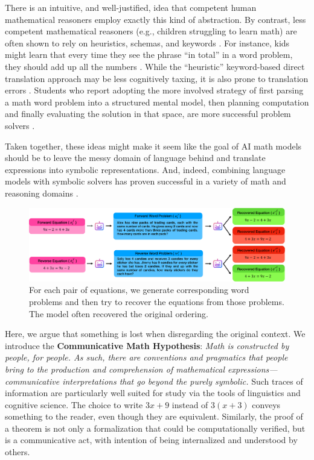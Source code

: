 \documentclass{article}
\begin{document}
There is an intuitive, and well-justified, idea that competent human mathematical reasoners employ exactly this kind of abstraction. 
By contrast, less competent mathematical reasoners (e.g., children struggling to learn math) are often shown to rely on heuristics, schemas, and keywords \citep{briars1984a,clement2005a,karp2019avoiding,powell2018effective,verschaffel2000making}.
For instance, kids might learn that every time they see the phrase ``in total'' in a word problem, they should add up all the numbers \citep{powell2022investigation}.
While the ``heuristic'' keyword-based direct translation approach may be less cognitively taxing, it is also prone to translation errors \citep{verschaffel2020word}.
Students who report adopting the more involved strategy of first parsing a math word problem into a structured mental model, then planning computation and finally evaluating the solution in that space, are more successful problem solvers \citep{hegarty1995comprehension}.



Taken together, these ideas might make it seem like the goal of AI math models should be to leave the messy domain of language behind and translate expressions into symbolic representations. 
And, indeed, combining language models with symbolic solvers has proven successful in a variety of math and reasoning domains \citep{borazjanizadeh2024reliable,gao2023pal,he2023solving,olausson2023linc,sprague2024cotcotchainofthoughthelps,ye2024satlm}.


\begin{figure}
    \centering
\includegraphics[width=1\linewidth]{robot-figv2.pdf}
    \vspace{-15pt}
    \caption{For each pair of equations, we generate corresponding word problems and then try to recover the equations from those problems. The model often recovered the original ordering.}\label{fig:method1}
    \vspace{-7.5pt}
\end{figure}

Here, we argue that something is lost when disregarding 
the original context.
We introduce the \textbf{Communicative Math Hypothesis}:
\textit{Math is constructed by people, for people. As such, there are conventions and pragmatics that people bring to the production and comprehension of mathematical expressions---communicative interpretations that go beyond the purely symbolic.} Such traces of information are particularly well suited for study via the tools of linguistics and cognitive science.
The choice to write \(3x + 9\) instead of \(3(x + 3)\) conveys something to the reader, even though they are equivalent.
{Similarly, the proof of a theorem is not only a formalization that could be computationally verified, but is a communicative act, with intention of being internalized and understood by others.}
\end{document}
